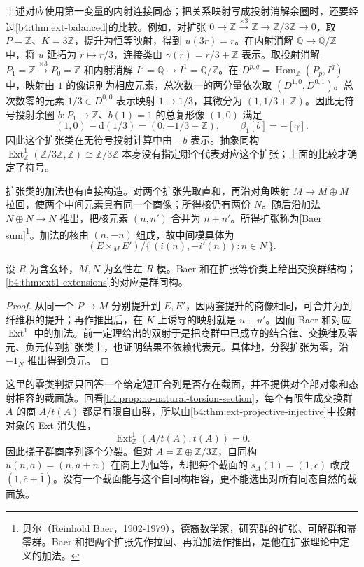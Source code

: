 上述对应使用第一变量的内射连接同态；把关系映射写成投射消解余圈时，还要经过\cref{b4:thm:ext-balanced}的比较。例如，对扩张 \(0\to\mathbb Z\xrightarrow{\times3}\mathbb Z\to\mathbb Z/3\mathbb Z\to0\)，取 \(P=\mathbb Z\)、\(K=3\mathbb Z\)，提升为恒等映射，得到 \(u(3r)=r\)。在内射消解 \(\mathbb Q\to\mathbb Q/\mathbb Z\) 中，将 \(u\) 延拓为 \(r\mapsto r/3\)，连接类由 \(\gamma(\bar r)=r/3+\mathbb Z\) 表示。取投射消解 \(P_1=\mathbb Z\xrightarrow{\times3}P_0=\mathbb Z\) 和内射消解 \(I^0=\mathbb Q\to I^1=\mathbb Q/\mathbb Z\)。在 \(D^{p,q}=\operatorname{Hom}_{\mathbb Z}(P_p,I^q)\) 中，映射由 \(1\) 的像识别为相应元素，总次数一的两分量依次取 \((D^{1,0},D^{0,1})\)。总次数零的元素 \(1/3\in D^{0,0}\) 表示映射 \(1\mapsto1/3\)，其微分为 \((1,1/3+\mathbb Z)\)。因此无符号投射余圈 \(b:P_1\to\mathbb Z\)、\(b(1)=1\) 的总复形像 \((1,0)\) 满足
\[
	(1,0)-\mathrm d(1/3)=(0,-1/3+\mathbb Z), \qquad \beta_1[b]=-[\gamma].
\]
因此这个扩张类在无符号投射计算中由 \(-b\) 表示。抽象同构 \(\operatorname{Ext}_{\mathbb Z}^1(\mathbb Z/3\mathbb Z,\mathbb Z)\cong\mathbb Z/3\mathbb Z\) 本身没有指定哪个代表对应这个扩张；上面的比较才确定了符号。

\ProseParagraphBreak
扩张类的加法也有直接构造。对两个扩张先取直和，再沿对角映射 \(M\to M\oplus M\) 拉回，使两个中间元素具有同一个商像；所得核仍有两份 \(N\)。随后沿加法 \(N\oplus N\to N\) 推出，把核元素 \((n,n')\) 合并为 \(n+n'\)。所得扩张称为[Baer sum]\footnote{贝尔（Reinhold Baer，1902-1979），德裔数学家，研究群的扩张、可解群和幂零群。Baer 和把两个扩张先作拉回、再沿加法作推出，是他在扩张理论中定义的加法。}。加法的核由 \((n,-n)\) 组成，故中间模具体为
\[
	(E\times_M E')/\{\,(i(n),-i'(n)):n\in N\,\}.
\]

\begin{proposition}\label{b4:prop:baer-addition}
	设 \(R\) 为含幺环，\(M,N\) 为幺性左 \(R\) 模。Baer 和在扩张等价类上给出交换群结构；\cref{b4:thm:ext1-extensions}的对应是群同构。
\end{proposition}
\begin{proof}
	从同一个 \(P\to M\) 分别提升到 \(E,E'\)，因两套提升的商像相同，可合并为到纤维积的提升；再作推出后，在 \(K\) 上诱导的映射就是 \(u+u'\)。因而 Baer 和对应 \(\operatorname{Ext}^1\) 中的加法。前一定理给出的双射于是把商群中已成立的结合律、交换律及零元、负元传到扩张类上，也证明结果不依赖代表元。具体地，分裂扩张为零，沿 \(-1_N\) 推出得到负元。
\end{proof}

这里的零类判据只回答一个给定短正合列是否存在截面，并不提供对全部对象和态射相容的截面族。回看\cref{b4:prop:no-natural-torsion-section}，每个有限生成交换群 \(A\) 的商 \(A/t(A)\) 都是有限自由群，所以由\cref{b4:thm:ext-projective-injective}中投射对象的 Ext 消失性，
\[
	\operatorname{Ext}_{\mathbb Z}^1(A/t(A),t(A))=0.
\]
因此挠子群商序列逐个分裂。但对 \(A=\mathbb Z\oplus\mathbb Z/3\mathbb Z\)，自同构 \(u(n,\bar a)=(n,\bar a+\bar n)\) 在商上为恒等，却把每个截面的 \(s_A(1)=(1,\bar c)\) 改成 \((1,\bar c+\bar1)\)。没有一个截面能与这个自同构相容，更不能选出对所有同态自然的截面族。

